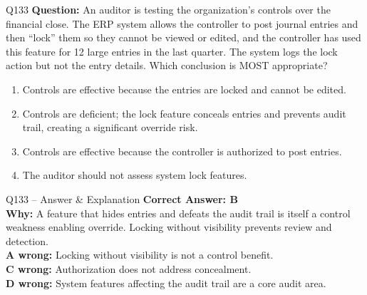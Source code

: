 \documentclass[aspectratio=169,10pt]{beamer}
\begin{document}
	\begin{frame}[t]{Q133}
		\small
		\textbf{Question:} An auditor is testing the organization's controls over the financial close. The ERP system allows the controller to post journal entries and then ``lock'' them so they cannot be viewed or edited, and the controller has used this feature for 12 large entries in the last quarter. The system logs the lock action but not the entry details. Which conclusion is MOST appropriate?
		\begin{enumerate}[label=\Alph*.,itemsep=1pt,topsep=2pt]
			\item Controls are effective because the entries are locked and cannot be edited.
			\item Controls are deficient; the lock feature conceals entries and prevents audit trail, creating a significant override risk.
			\item Controls are effective because the controller is authorized to post entries.
			\item The auditor should not assess system lock features.
		\end{enumerate}
	\end{frame}
	
	\begin{frame}[t]{Q133 -- Answer \& Explanation}
		\small
		\textbf{Correct Answer: B} \\[4pt]
		\textbf{Why:} A feature that hides entries and defeats the audit trail is itself a control weakness enabling override. Locking without visibility prevents review and detection. \\[4pt]
		\textbf{A wrong:} Locking without visibility is not a control benefit. \\[2pt]
		\textbf{C wrong:} Authorization does not address concealment. \\[2pt]
		\textbf{D wrong:} System features affecting the audit trail are a core audit area.
	\end{frame}
	
\end{document}
